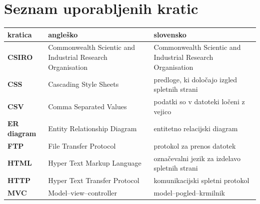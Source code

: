 \documentclass[a4paper, 12pt]{book}
\newcommand{\clearemptydoublepage}{\newpage{\pagestyle{empty}\cleardoublepage}}
\begin{document}
\clearemptydoublepage


\pagestyle{empty}
\def\thepage{}%
\tableofcontents{}


\let\cleardoublepage=\clearpage


\chapter*{Seznam uporabljenih kratic}  %
\noindent\begin{tabular}{p{}|p{}|p{}}    %
  {\bf kratica} & {\bf angleško}                             & {\bf slovensko} \\ \hline
  {\bf CSIRO} & Commonwealth Scientic and Industrial Research Organisation & Commonwealth Scientic and Industrial Research Organisation \\
  {\bf CSS} & Cascading Style Sheets & predloge, ki določajo izgled spletnih strani \\
  {\bf CSV} & Comma Separated Values & podatki so v datoteki ločeni z vejico \\
  {\bf ER diagram} & Entity Relationship Diagram & entitetno relacijski diagram \\
  {\bf FTP} & File Transfer Protocol & protokol za prenos datotek \\
  {\bf HTML} & Hyper Text Markup Language & označevalni jezik za izdelavo spletnih strani \\
  {\bf HTTP} & Hyper Text Transfer Protocol & komunikacijski spletni protokol \\
  {\bf MVC} & Model--view--controller & model--pogled--krmilnik \\

\end{tabular}
\end{document}

